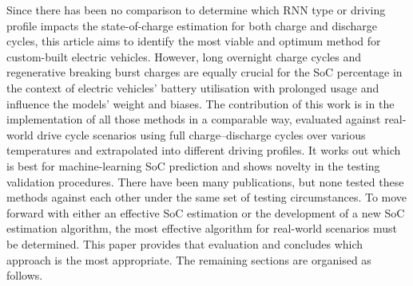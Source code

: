 %
%
 {
    Since there has been no comparison to determine which RNN type or driving profile impacts the state-of-charge estimation for both charge and discharge cycles, this article aims to identify the most viable and optimum method for custom-built electric vehicles.
}
However, long overnight charge cycles and regenerative breaking burst charges are equally crucial for the SoC percentage in the context of electric vehicles' battery utilisation with prolonged usage and influence the models' weight and biases.
The contribution of this work is in the implementation of all those methods in a comparable way, evaluated against real-world drive cycle scenarios using full charge--discharge cycles over various temperatures and extrapolated into different driving profiles.
It works out which is best for machine-learning SoC prediction and shows novelty in the testing validation procedures.
There have been many publications, but none tested these methods against each other under the same set of testing circumstances.
To move forward with either an effective SoC estimation or the development of a new SoC estimation algorithm,  the most effective algorithm for real-world scenarios must be determined.
This paper provides that evaluation and concludes which approach is the most appropriate.
%
%
The remaining sections are organised as follows.
